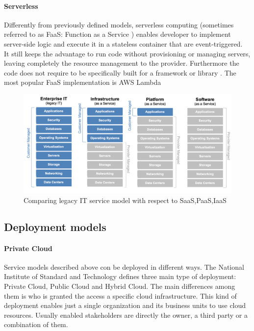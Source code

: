 \paragraph{Serverless}
\label{paragraph:Serverless}
Differently from previously defined models, serverless computing (sometimes referred to as FaaS: Function as a Service \cite{sls_wikipedia}) enables developer to implement server-side logic and execute it in a stateless container that are event-triggered.\\
It still keeps the advantage to run code without provisioning or managing servers, leaving completely the resource management to the provider.
Furthermore the code does not require to be specifically built for a framework or library \cite{martin_serverless}.
The most popular FaaS implementation is AWS Lambda

\begin{figure}[h]
    \centering
    \includegraphics[width=\textwidth,keepaspectratio]{img/saas_paas_iaas}
    \caption{Comparing legacy IT service model with respect to SaaS,PaaS,IaaS}
    \label{fig:saas_paas_iaas}
\end{figure}

\subsection{Deployment models}

\paragraph{Private Cloud}
Service models described above con be deployed in different ways. The National Institute of Standard and Technology defines three main type of deployment: Private Cloud, Public Cloud and Hybrid Cloud. \cite{nist}
The main differences among them is who is granted the access a specific cloud infrastructure.
\label{paragraph:Private Cloud}
This kind of deployment enables just a single organization and its business units to use cloud resources.
Usually enabled stakeholders are directly the owner, a third party or a combination of them.
